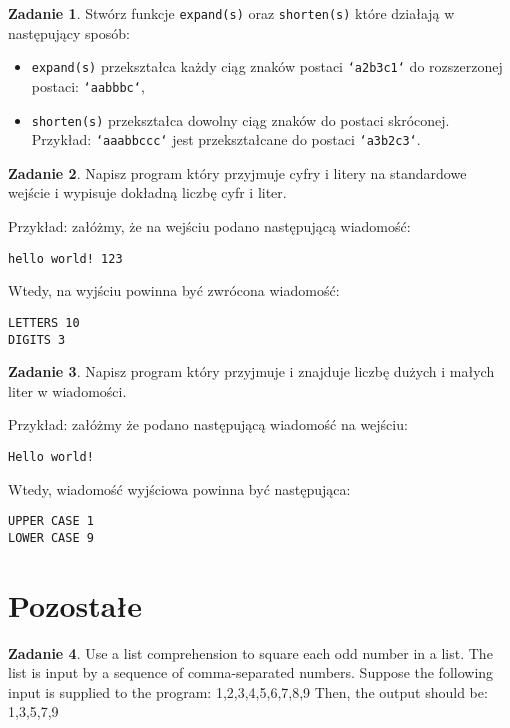 \documentclass[11pt]{article}
\theoremstyle{definition}
\newtheorem{zadanie}{Zadanie}
\begin{document}
\begin{zadanie}
Stwórz funkcje \texttt{expand(s)} oraz \texttt{shorten(s)} które działają w następujący sposób:
\begin{itemize}
\item \texttt{expand(s)} przekształca każdy ciąg znaków postaci \texttt{`a2b3c1`} do rozszerzonej postaci: \texttt{`aabbbc`},
\item \texttt{shorten(s)} przekształca dowolny ciąg znaków do postaci skróconej. Przykład: \texttt{`aaabbccc`} jest przekształcane do postaci \texttt{`a3b2c3`}.
\end{itemize}
\end{zadanie}

\begin{zadanie}
Napisz program który przyjmuje cyfry i litery na standardowe wejście i wypisuje dokładną liczbę cyfr i liter.

Przykład: załóżmy, że na wejściu podano następującą wiadomość:
\begin{verbatim}
hello world! 123
\end{verbatim}
Wtedy, na wyjściu powinna być zwrócona wiadomość:
\begin{verbatim}
LETTERS 10
DIGITS 3
\end{verbatim}
\end{zadanie}


\begin{zadanie}
Napisz program który przyjmuje i znajduje liczbę dużych i małych liter w wiadomości.

Przykład: załóżmy że podano następującą wiadomość na wejściu:
\begin{verbatim}
Hello world!
\end{verbatim}
Wtedy, wiadomość wyjściowa powinna być następująca:
\begin{verbatim}
UPPER CASE 1
LOWER CASE 9
\end{verbatim}

\end{zadanie}
\section{Pozostałe}



\begin{zadanie}
Use a list comprehension to square each odd number in a list. The list is input by a sequence of comma-separated numbers.
Suppose the following input is supplied to the program:
1,2,3,4,5,6,7,8,9
Then, the output should be:
1,3,5,7,9

\end{zadanie}
\end{document}
